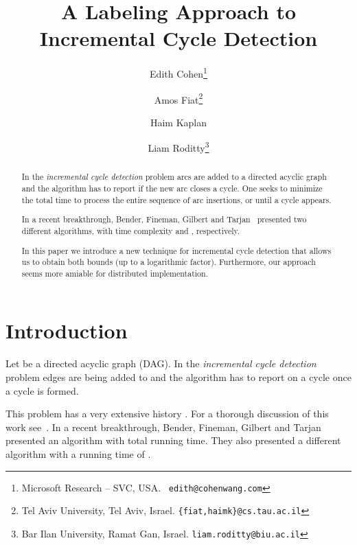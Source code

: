 \documentclass[11pt]{article}
\theoremstyle{plain}
\theoremstyle{definition}
\theoremstyle{remark}
\numberwithin{equation}{section}
\begin{document}
\title{A Labeling Approach to Incremental Cycle Detection}

\author{Edith Cohen\thanks{Microsoft Research -- SVC, USA. {\tt
      edith@cohenwang.com}}   \and Amos Fiat\thanks{Tel Aviv
    University, Tel Aviv, Israel. {\tt  \{fiat,haimk\}@cs.tau.ac.il}}
\and Haim Kaplan \and Liam
Roditty\thanks{Bar Ilan University, Ramat Gan, Israel. {\tt liam.roditty@biu.ac.il}}}

\maketitle

\begin{abstract}
In the \emph{incremental cycle detection} problem arcs are added to
a directed acyclic graph and the algorithm has to report if the new
arc closes a cycle. One seeks to minimize the total time to process
the entire sequence of arc insertions, or until a cycle appears.

In a recent breakthrough, Bender, Fineman, Gilbert and
Tarjan~\cite{BeFiGiTa11} presented two different algorithms, with
time complexity   and , respectively.

In this paper we introduce a new technique for incremental cycle
detection that allows us to obtain both bounds (up to a logarithmic
factor). Furthermore, our approach seems more amiable for
distributed implementation.
\end{abstract}\textbf{}

\thispagestyle{empty}

\newpage
\setcounter{page}{1}


\section{Introduction}


Let  be a directed acyclic graph (DAG). In the
\emph{incremental cycle detection} problem edges are being added to
 and the algorithm has to report on a cycle once a cycle is
formed.

This problem has a very extensive history
\cite{AlpernHRSZ90,Marchetti-SpaccamelaNR96,PearceK06,KatrielB06,LiuC07,AjwaniFM08,AjwaniF10,DBLP:journals/corr/abs-0711-0251,HKMST:Talg12,BFG:SODA09}.
For a thorough discussion of this work see~\cite{HKMST:Talg12}.  In
a recent breakthrough, Bender, Fineman, Gilbert and
Tarjan~\cite{BeFiGiTa11} presented an algorithm with 
total running time. They also presented a different algorithm with a
running time of .
\end{document}
